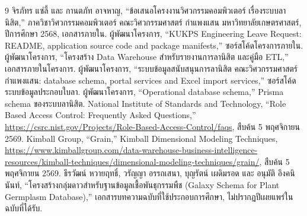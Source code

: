\begin{thebibliography}{9}
   จิรภัทร แซ่ลี้ และ กานตภัท อาจหาญ,
  ``ข้อเสนอโครงงานวิศวกรรมคอมพิวเตอร์ เรื่องระบบลานิสิต,''
  ภาควิชาวิศวกรรมคอมพิวเตอร์ คณะวิศวกรรมศาสตร์ กำแพงแสน
  มหาวิทยาลัยเกษตรศาสตร์, ปีการศึกษา 2568, เอกสารภายใน.
   ผู้พัฒนาโครงการ, ``KUKPS Engineering Leave Request:
  README, application source code and package manifests,''
  ซอร์สโค้ดโครงการภายใน.
   ผู้พัฒนาโครงการ, ``โครงสร้าง Data Warehouse
  สำหรับรายงานการลานิสิต และคู่มือ ETL,'' เอกสารภายในโครงการ.
   ผู้พัฒนาโครงการ,
  ``ระบบข้อมูลสนับสนุนการลานิสิต คณะวิศวกรรมศาสตร์ กำแพงแสน: database
  schema, portal services and Excel import services,''
  ซอร์สโค้ดระบบข้อมูลประกอบใบลา.
   ผู้พัฒนาโครงการ, ``Operational database schema,''
  Prisma schema ของระบบลานิสิต.
   National Institute of Standards and Technology,
  ``Role Based Access Control: Frequently Asked Questions,''
  \url{https://csrc.nist.gov/Projects/Role-Based-Access-Control/faqs},
  สืบค้น 5 พฤศจิกายน 2569.
   Kimball Group, ``Grain,''
  Kimball Dimensional Modeling Techniques,
  \url{https://www.kimballgroup.com/data-warehouse-business-intelligence-resources/kimball-techniques/dimensional-modeling-techniques/grain/},
  สืบค้น 5 พฤศจิกายน 2569.
   ธีรวัฒน์ หวายฤทธิ์, วรัญญา อรรถเสนา,
  บุญรัตน์ เผดิมรอด และ อนุมัติ อิงคนินันท์,
  ``โครงสร้างกลุ่มดาวสำหรับฐานข้อมูลเชื้อพันธุกรรมพืช
  (Galaxy Schema for Plant Germplasm Database),''
  เอกสารบทความฉบับที่ใช้ประกอบการศึกษา, ไม่ปรากฏปีเผยแพร่ในฉบับที่ได้รับ.
\end{thebibliography}
